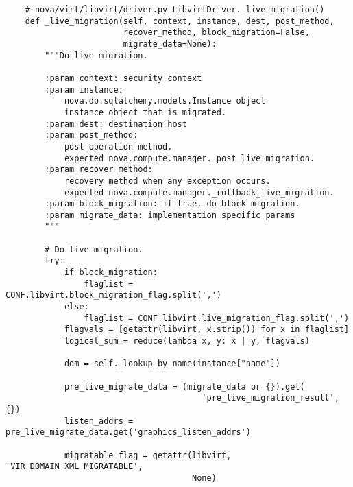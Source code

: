 \documentclass[a4paper,left=1.5cm,right=1.5cm,11pt]{article}
\begin{document}
    \begin{lstlisting}
    # nova/virt/libvirt/driver.py LibvirtDriver._live_migration()
    def _live_migration(self, context, instance, dest, post_method,
                        recover_method, block_migration=False,
                        migrate_data=None):
        """Do live migration.

        :param context: security context
        :param instance:
            nova.db.sqlalchemy.models.Instance object
            instance object that is migrated.
        :param dest: destination host
        :param post_method:
            post operation method.
            expected nova.compute.manager._post_live_migration.
        :param recover_method:
            recovery method when any exception occurs.
            expected nova.compute.manager._rollback_live_migration.
        :param block_migration: if true, do block migration.
        :param migrate_data: implementation specific params
        """

        # Do live migration.
        try:
            if block_migration:
                flaglist = CONF.libvirt.block_migration_flag.split(',')
            else:
                flaglist = CONF.libvirt.live_migration_flag.split(',')
            flagvals = [getattr(libvirt, x.strip()) for x in flaglist]
            logical_sum = reduce(lambda x, y: x | y, flagvals)

            dom = self._lookup_by_name(instance["name"])

            pre_live_migrate_data = (migrate_data or {}).get(
                                        'pre_live_migration_result', {})
            listen_addrs = pre_live_migrate_data.get('graphics_listen_addrs')

            migratable_flag = getattr(libvirt, 'VIR_DOMAIN_XML_MIGRATABLE',
                                      None)


\end{lstlisting}
\end{document}
